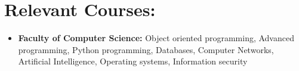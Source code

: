 \documentclass[10pt,a4paper,sans]{moderncv}
\begin{document}
	\section{Relevant Courses:}
		\begin{itemize}
			\vspace{5pt}
			\item \textbf{Faculty of Computer Science: }Object oriented programming, Advanced programming, Python programming, Databases, Computer Networks, 
			Artificial Intelligence, Operating systems, Information security
		\end{itemize}
	
	\clearpage
\end{document}
